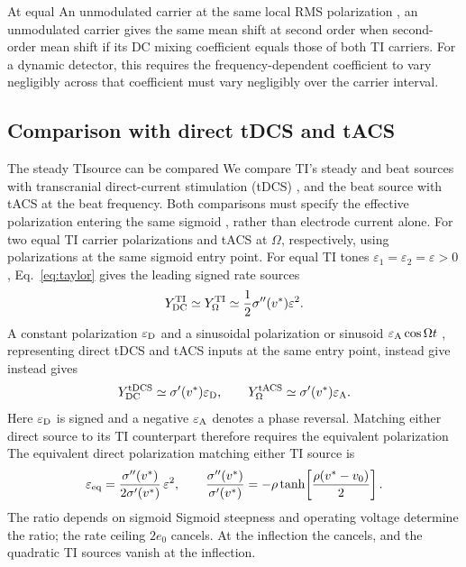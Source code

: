 \documentclass[11pt,a4paper]{article}
\newcommand{\Sig}{\sigma}
\providecommand{\DIFaddtex}[1]{{\protect\color{blue} \sf #1}} %
\providecommand{\DIFdeltex}[1]{{\protect\color{red} \scriptsize #1}} %
\providecommand{\DIFaddbegin}{} %
\providecommand{\DIFaddend}{} %
\providecommand{\DIFdelbegin}{} %
\providecommand{\DIFdelend}{} %
\providecommand{\DIFadd}[1]{\texorpdfstring{\DIFaddtex{#1}}{#1}} %
\providecommand{\DIFdel}[1]{\texorpdfstring{\DIFdeltex{#1}}{}} %
\begin{document}
\fi
\DIFdelbegin \DIFdel{At equal }\DIFdelend \DIFaddbegin \DIFadd{An unmodulated carrier at the same }\DIFaddend local RMS polarization \DIFdelbegin \DIFdel{, an unmodulated
carrier }\DIFdelend gives the same
\DIFdelbegin \DIFdel{mean shift at second order when }\DIFdelend \DIFaddbegin \DIFadd{second-order mean shift if }\DIFaddend its DC mixing coefficient equals those of both
TI carriers. For a dynamic detector, \DIFdelbegin \DIFdel{this requires the
frequency-dependent coefficient to vary negligibly
across }\DIFdelend \DIFaddbegin \DIFadd{that coefficient must vary negligibly
over }\DIFaddend the carrier interval.

\subsection{Comparison with direct tDCS and tACS}\label{sec:direct-comparison}
\DIFdelbegin \DIFdel{The steady TIsource can be compared }\DIFdelend \DIFaddbegin \DIFadd{We compare TI's steady and beat sources }\DIFaddend with transcranial direct-current
stimulation (tDCS) \DIFdelbegin \DIFdel{, and the beat source with tACS at the beat frequency. Both comparisons
must specify the effective polarization entering the same sigmoid , rather than electrode
current alone. For two equal TI carrier polarizations
}\DIFdelend \DIFaddbegin \DIFadd{and tACS at $\Omega$, respectively, using polarizations
at the same sigmoid entry point. For equal TI tones
}\DIFaddend $\varepsilon_1=\varepsilon_2=\varepsilon>0$,
\DIFdelbegin \DIFdel{Eq.~\eqref{eq:taylor} gives the leading
signed rate sources
}\DIFdelend \[
Y_{\rm DC}^{\rm TI}\simeq Y_\Omega^{\rm TI}
\simeq \frac{1}{2}\Sig''(v^*)\varepsilon^2.
\]
A constant polarization $\varepsilon_{\rm D}$ \DIFdelbegin \DIFdel{and a sinusoidal polarization
}\DIFdelend \DIFaddbegin \DIFadd{or sinusoid
}\DIFaddend $\varepsilon_{\rm A}\cos\Omega t$ \DIFdelbegin \DIFdel{, representing direct tDCS and tACS inputs at
the same entry point, instead give
}\DIFdelend \DIFaddbegin \DIFadd{instead gives
}\DIFaddend \[
Y_{\rm DC}^{\rm tDCS}\simeq\Sig'(v^*)\varepsilon_{\rm D},
\qquad
Y_\Omega^{\rm tACS}\simeq\Sig'(v^*)\varepsilon_{\rm A}.
\]
Here $\varepsilon_{\rm D}$ is signed and \DIFdelbegin \DIFdel{a }\DIFdelend negative $\varepsilon_{\rm A}$
denotes \DIFdelbegin \DIFdel{a }\DIFdelend phase reversal. \DIFdelbegin \DIFdel{Matching either direct source to its TI counterpart therefore
requires the equivalent polarization
}\DIFdelend \DIFaddbegin \DIFadd{The equivalent direct polarization matching either
TI source is
}\DIFaddend \[
\varepsilon_{\rm eq}
=\frac{\Sig''(v^*)}{2\Sig'(v^*)}\,\varepsilon^2,
\qquad
\frac{\Sig''(v^*)}{\Sig'(v^*)}
=-\rho\tanh\!\left[\frac{\rho(v^*-v_0)}{2}\right].
\]
\DIFdelbegin \DIFdel{The ratio depends on sigmoid }\DIFdelend \DIFaddbegin \DIFadd{Sigmoid }\DIFaddend steepness and operating voltage \DIFaddbegin \DIFadd{determine the ratio}\DIFaddend ; the rate ceiling
\DIFdelbegin \DIFdel{$2e_0$ cancels. At the inflection the }\DIFdelend \DIFaddbegin \DIFadd{cancels, and the }\DIFaddend quadratic TI sources vanish \DIFaddbegin \DIFadd{at the inflection}\DIFaddend .
\end{document}
